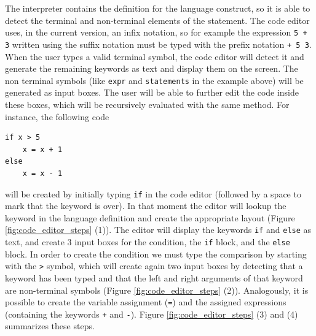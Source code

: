 The interpreter contains the definition for the language construct, so it is able to detect the terminal and non-terminal elements of the statement. The code editor uses, in the current version, an infix notation, so for example the expression \texttt{5 + 3} written using the suffix notation must be typed with the prefix notation \texttt{+ 5 3}. When the user types a valid terminal symbol, the code editor will detect it and generate the remaining keywords as text and display them on the screen. The non terminal symbols (like \texttt{expr} and \texttt{statements} in the example above) will be generated as input boxes. The user will be able to further edit the code inside these boxes, which will be recursively evaluated with the same method. For instance, the following code

\begin{lstlisting}
if x > 5
	x = x + 1
else
	x = x - 1
\end{lstlisting}

\noindent
will be created by initially typing \texttt{if} in the code editor (followed by a space to mark that the keyword is over). In that moment the editor will lookup the keyword in the language definition and create the appropriate layout (Figure \ref{fig:code_editor_steps} (1)). The editor will display the keywords \texttt{if} and \texttt{else} as text, and create 3 input boxes for the condition, the \texttt{if} block, and the \texttt{else} block. In order to create the condition we must type the comparison by starting with the \texttt{>} symbol, which will create again two input boxes by detecting that a keyword has been typed and that the left and right arguments of that keyword are non-terminal symbols (Figure \ref{fig:code_editor_steps} (2)). Analogously, it is possible to create the variable assignment (\texttt{=}) and the assigned expressions (containing the keywords \texttt{+} and \texttt{-}). Figure \ref{fig:code_editor_steps} (3) and (4) summarizes these steps.

